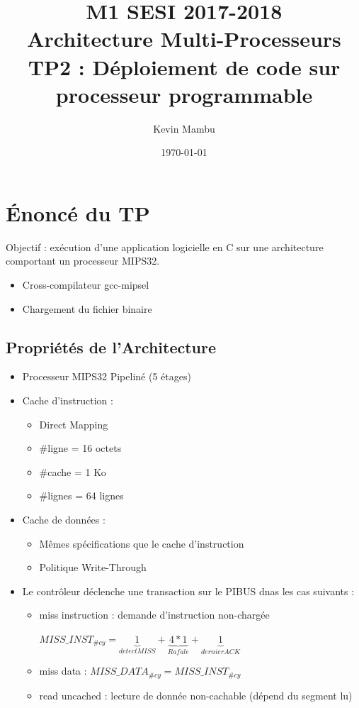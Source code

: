 \documentclass[10pt]{article}
\author{Kevin Mambu}
\date{\today}
\title{M1 SESI 2017-2018\\Architecture Multi-Processeurs\\TP2 : Déploiement de
code sur processeur programmable}
\begin{document}
\maketitle

\section{Énoncé du TP}
Objectif : exécution d'une application logicielle en C sur une architecture
comportant un processeur MIPS32.
\begin{itemize}
  \item Cross-compilateur gcc-mipsel
  \item Chargement du fichier binaire
\end{itemize}

\subsection{Propriétés de l'Architecture}
\begin{itemize}
  \item Processeur MIPS32 Pipeliné (5 étages)
  \item Cache d'instruction :
  \begin{itemize}
    \item Direct Mapping
    \item \#ligne = 16 octets
    \item \#cache = 1 Ko
    \item \#lignes = 64 lignes
  \end{itemize}
  \item Cache de données :
  \begin{itemize}
    \item Mêmes spécifications que le cache d'instruction
    \item Politique Write-Through
  \end{itemize}
  \item Le contrôleur déclenche une transaction sur le PIBUS dnas les cas suivants :
  \begin{itemize}
    \item miss instruction : demande d'instruction non-chargée\\
    \begin{center}
      ${MISS\_INST_{\#cy}}=\underbrace{1}_{detect MISS}+\underbrace{4*1}_{Rafale}+\underbrace{1}_{dernier ACK}$
    \end{center}
    \item miss data : ${MISS\_DATA_{\#cy}} = {MISS\_INST_{\#cy}}$
    \item read uncached : lecture de donnée non-cachable (dépend du segment lu)
  \end{itemize}
\end{itemize}
\end{document}
